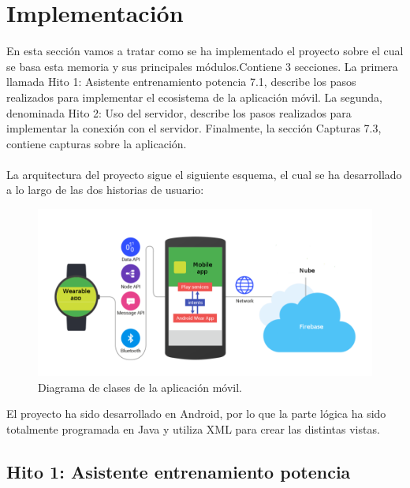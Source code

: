 \chapter{Implementación}

En esta sección vamos a tratar como se ha implementado el proyecto sobre el cual se basa esta memoria y sus principales módulos.Contiene 3 secciones. La primera llamada Hito 1: Asistente entrenamiento potencia 7.1, describe los pasos realizados para implementar el ecosistema de la aplicación móvil. La segunda, denominada Hito 2: Uso del servidor, describe los pasos realizados para implementar la conexión con el servidor. Finalmente, la sección Capturas 7.3, contiene capturas sobre la aplicación.
\\
\\

La arquitectura del proyecto sigue el siguiente esquema, el cual se ha desarrollado a lo largo de las dos historias de usuario:

\begin{figure}[H]
	\centering
	\includegraphics[scale=0.4]{imagenes/arquitectura.png}
	\caption{Diagrama de clases de la aplicación móvil.}
	\label{Arquitectura del sistema}
\end{figure}

El proyecto ha sido desarrollado en Android, por lo que la parte lógica ha sido totalmente programada en Java y utiliza XML para crear las distintas vistas.

\section{Hito 1: Asistente entrenamiento potencia}


